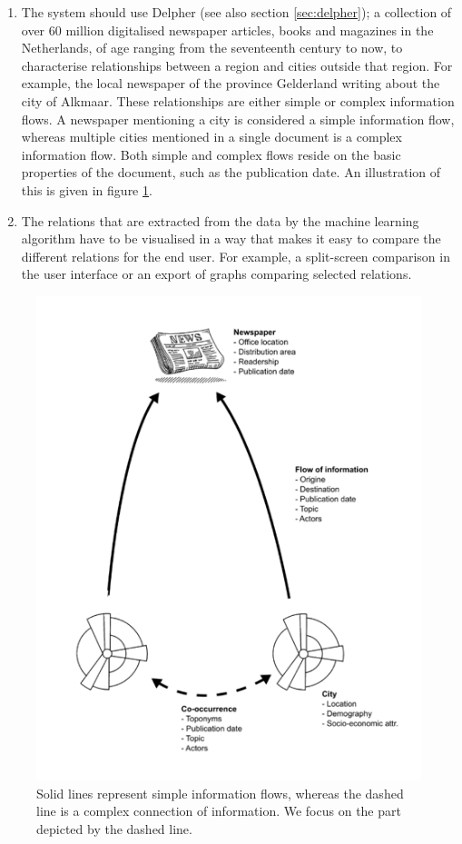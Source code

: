 \begin{enumerate}
    \item The system should use Delpher (see also section \ref{sec:delpher}); a collection of over 60 million digitalised newspaper articles, books and magazines in the Netherlands, of age ranging from the seventeenth century to now, to characterise relationships between a region and cities outside that region. For example, the local newspaper of the province Gelderland writing about the city of Alkmaar. These relationships are either simple or complex information flows. A newspaper mentioning a city is considered a simple information flow, whereas multiple cities mentioned in a single document is a complex information flow. Both simple and complex flows reside on the basic properties of the document, such as the publication date. An illustration of this is given in figure \ref{fig:infoflow}.
    \item The relations that are extracted from the data by the machine learning algorithm have to be visualised in a way that makes it easy to compare the different relations for the end user. For example, a split-screen comparison in the user interface or an export of graphs comparing selected relations.
\end{enumerate}
\begin{figure}
    \centering
    \includegraphics{informationflow}
    \caption{Solid lines represent simple information flows, whereas the dashed line is a complex connection of information. We focus on the part depicted by the dashed line.}
    \label{fig:infoflow}
\end{figure}
